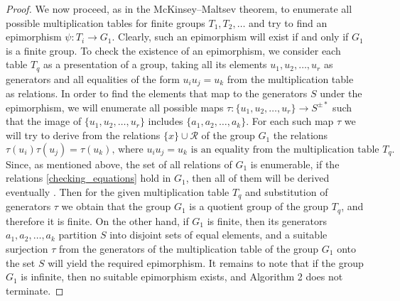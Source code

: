 \documentclass[12pt,a4paper]{amsart}
\begin{document}
\begin{proof}
We now proceed, as in the McKinsey--Maltsev theorem, to enumerate all possible multiplication tables for finite groups $T_1,T_2,\ldots$ and try to find an epimorphism $\psi:T_i\to G_1$. Clearly, such an epimorphism will exist if and only if $G_1$ is a finite group. To check the existence of an epimorphism, we consider each table $T_q$ as a presentation of a group, taking all its elements $u_1,u_2,\ldots,u_r$ as generators and all equalities of the form $u_iu_j=u_k$ from the multiplication table as relations. In order to find the elements that map to the generators $S$ under the epimorphism, we will enumerate all possible maps $\tau:\{u_1,u_2,\ldots,u_r\}\to S^{\pm *}$ such that the image of $\{u_1,u_2,\ldots,u_r\}$ includes $\{a_1,a_2,\ldots,a_k\}$. For each such map $\tau$ we will try to derive from the relations $\{x\}\cup \mathcal R$ of the group $G_1$ the relations
\begin{equation}
\label{checking_equations}
\tau(u_i)\tau(u_j)=\tau(u_k), \, \text{where } u_iu_j=u_k \text{ is an equality from the multiplication table } T_q.
\end{equation} Since, as mentioned above, the set of all relations of $G_1$ is enumerable, if the relations \eqref{checking_equations} hold in $G_1$, then all of them will be derived eventually 
. Then for the given multiplication table $T_q$ and substitution of generators $\tau$ we obtain that the group $G_1$ is a quotient group of the group $T_q$, and therefore it is finite. On the other hand, if $G_1$ is finite, then its generators $a_1,a_2,\ldots,a_k$ partition $S$ into disjoint sets of equal elements, and a suitable surjection $\tau$ from the generators of the multiplication table of the group $G_1$ onto the set $S$ will yield the required epimorphism. It remains to note that if the group $G_1$ is infinite, then no suitable epimorphism exists, and Algorithm 2 does not terminate.
\end{proof}
\end{document}
